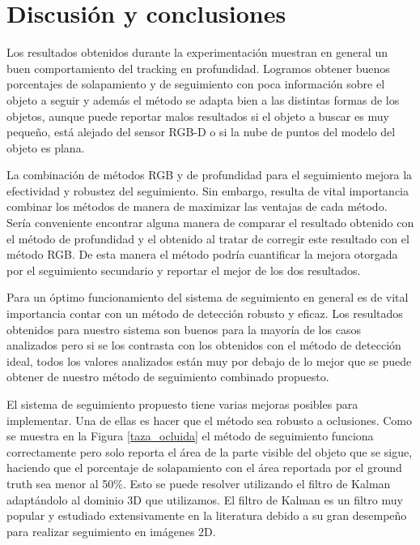 \chapter{Discusión y conclusiones}
Los resultados obtenidos durante la experimentación muestran en general un buen comportamiento del tracking en profundidad. Logramos obtener buenos porcentajes de solapamiento y de seguimiento con poca información sobre el objeto a seguir y además el método se adapta bien a las distintas formas de los objetos, aunque puede reportar malos resultados si el objeto a buscar es muy pequeño, está alejado del sensor RGB-D o si la nube de puntos del modelo del objeto es plana.

La combinación de métodos RGB y de profundidad para el seguimiento mejora la efectividad y robustez del seguimiento. Sin embargo, resulta de vital importancia combinar los métodos de manera de maximizar las ventajas de cada método. Sería conveniente encontrar alguna manera de comparar el resultado obtenido con el método de profundidad y el obtenido al tratar de corregir este resultado con el método RGB. De esta manera el método podría cuantificar la mejora otorgada por el seguimiento secundario y reportar el mejor de los dos resultados.

Para un óptimo funcionamiento del sistema de seguimiento en general es de vital importancia contar con un método de detección robusto y eficaz. Los resultados obtenidos para nuestro sistema son buenos para la mayoría de los casos analizados pero si se los contrasta con los obtenidos con el método de detección ideal, todos los valores analizados están muy por debajo de lo mejor que se puede obtener de nuestro método de seguimiento combinado propuesto.

El sistema de seguimiento propuesto tiene varias mejoras posibles para implementar. Una de ellas es hacer que el método sea robusto a oclusiones. Como se muestra en la Figura \ref{taza_ocluida} el método de seguimiento funciona correctamente pero solo reporta el área de la parte visible del objeto que se sigue, haciendo que el porcentaje de solapamiento con el área reportada por el ground truth sea menor al 50\%. Esto se puede resolver utilizando el filtro de Kalman \cite{welch1995introduction} adaptándolo al dominio 3D que utilizamos. El filtro de Kalman es un filtro muy popular y estudiado extensivamente en la literatura \cite{julier1997new,wan2000unscented} debido a su gran desempeño para realizar seguimiento en imágenes 2D.

